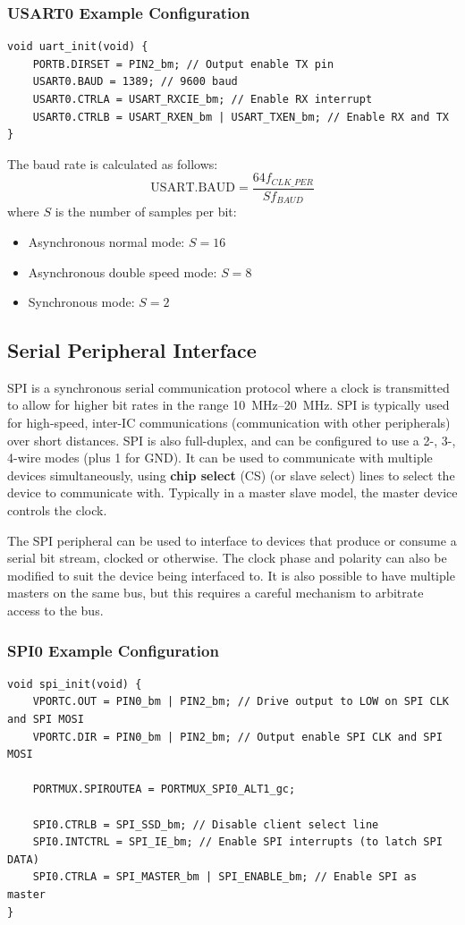 \documentclass[a4paper]{report}
\begin{document}
\subsubsection{USART0 Example Configuration}
\begin{verbatim}
void uart_init(void) {
    PORTB.DIRSET = PIN2_bm; // Output enable TX pin
    USART0.BAUD = 1389; // 9600 baud
    USART0.CTRLA = USART_RXCIE_bm; // Enable RX interrupt
    USART0.CTRLB = USART_RXEN_bm | USART_TXEN_bm; // Enable RX and TX
}
\end{verbatim}
The baud rate is calculated as follows:
\begin{equation*}
    \text{USART.BAUD} = \frac{64 f_{CLK\_PER}}{S f_{BAUD}}
\end{equation*}
where \(S\) is the number of samples per bit:
\begin{itemize}
    \item Asynchronous normal mode: \(S = 16\)
    \item Asynchronous double speed mode: \(S = 8\)
    \item Synchronous mode: \(S = 2\)
\end{itemize}
\subsection{Serial Peripheral Interface}
SPI is a synchronous serial communication protocol where a clock is transmitted
to allow for higher bit rates in the range \qtyrange{10}{20}{MHz}. SPI is typically
used for high-speed, inter-IC communications (communication with other peripherals) over short distances.
SPI is also full-duplex, and can be configured to use a 2-, 3-, 4-wire modes (plus 1 for GND).
It can be used to communicate with multiple devices simultaneously, using
\textbf{chip select} (CS) (or slave select) lines to select the device to communicate with.
Typically in a master slave model, the master device controls the clock.

The SPI peripheral can be used to interface to devices that produce or consume a serial bit stream, clocked or otherwise.
The clock phase and polarity can also be modified to suit the device being interfaced to. It is also possible to have multiple
masters on the same bus, but this requires a careful mechanism to arbitrate access to the bus.
\subsubsection{SPI0 Example Configuration}
\begin{verbatim}
void spi_init(void) {
    VPORTC.OUT = PIN0_bm | PIN2_bm; // Drive output to LOW on SPI CLK and SPI MOSI
    VPORTC.DIR = PIN0_bm | PIN2_bm; // Output enable SPI CLK and SPI MOSI

    PORTMUX.SPIROUTEA = PORTMUX_SPI0_ALT1_gc;

    SPI0.CTRLB = SPI_SSD_bm; // Disable client select line
    SPI0.INTCTRL = SPI_IE_bm; // Enable SPI interrupts (to latch SPI DATA)
    SPI0.CTRLA = SPI_MASTER_bm | SPI_ENABLE_bm; // Enable SPI as master
}
\end{verbatim}
\end{document}
